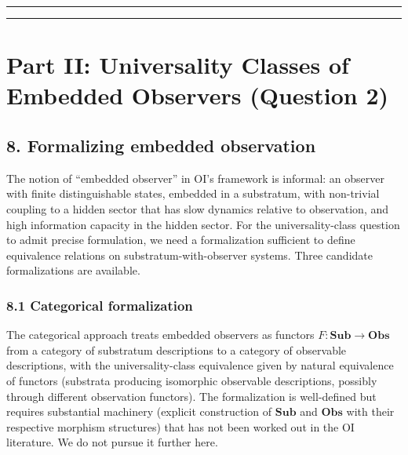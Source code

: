 \documentclass[
]{article}
\begin{document}
\begin{center}\rule{0.5\linewidth}{0.5pt}\end{center}

\begin{center}\rule{0.5\linewidth}{0.5pt}\end{center}

\hypertarget{part-ii-universality-classes-of-embedded-observers-question-2}{%
\section{Part II: Universality Classes of Embedded Observers (Question
2)}\label{part-ii-universality-classes-of-embedded-observers-question-2}}

\hypertarget{formalizing-embedded-observation}{%
\subsection{8. Formalizing embedded
observation}\label{formalizing-embedded-observation}}

The notion of ``embedded observer'' in OI's framework is informal: an
observer with finite distinguishable states, embedded in a substratum,
with non-trivial coupling to a hidden sector that has slow dynamics
relative to observation, and high information capacity in the hidden
sector. For the universality-class question to admit precise
formulation, we need a formalization sufficient to define equivalence
relations on substratum-with-observer systems. Three candidate
formalizations are available.

\hypertarget{categorical-formalization}{%
\subsubsection{8.1 Categorical
formalization}\label{categorical-formalization}}

The categorical approach treats embedded observers as functors
\(F: \mathbf{Sub} \to \mathbf{Obs}\) from a category of substratum
descriptions to a category of observable descriptions, with the
universality-class equivalence given by natural equivalence of functors
(substrata producing isomorphic observable descriptions, possibly
through different observation functors). The formalization is
well-defined but requires substantial machinery (explicit construction
of \(\mathbf{Sub}\) and \(\mathbf{Obs}\) with their respective morphism
structures) that has not been worked out in the OI literature. We do not
pursue it further here.
\end{document}
